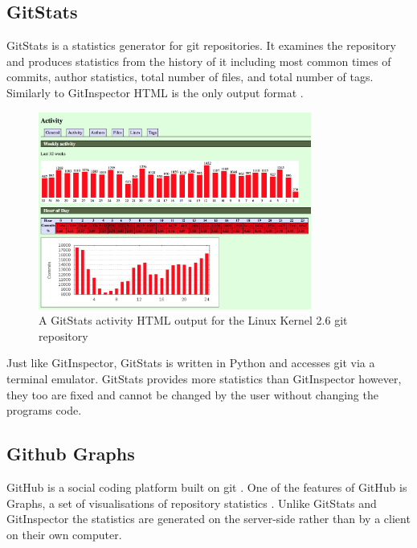\documentclass[11pt]{book}
\begin{document}
\subsection{GitStats}
GitStats is a statistics generator for git repositories. It examines the repository and produces statistics from the history of it including most common times of commits, author statistics, total number of files, and total number of tags. Similarly to GitInspector HTML is the only output format \cite{gitstatslinux}. 

\begin{figure}[h]
	\centering
	\includegraphics[width=0.8\textwidth]{images/gitstatslinux}
	\caption{A GitStats activity HTML output for the Linux Kernel 2.6 git repository \cite{gitstatslinux}}
	\label{fig:gitstatslinux}
\end{figure} 

Just like GitInspector, GitStats is written in Python and accesses git via a terminal emulator. GitStats provides more statistics than GitInspector however, they too are fixed and cannot be changed by the user without changing the programs code.

\subsection{Github Graphs}
GitHub is a social coding platform built on git \cite{gitpowersgithub}. One of the features of GitHub is Graphs, a set of visualisations of repository statistics \cite{githubgraphs}. Unlike GitStats and GitInspector the statistics are generated on the server-side rather than by a client on their own computer.
\end{document}
